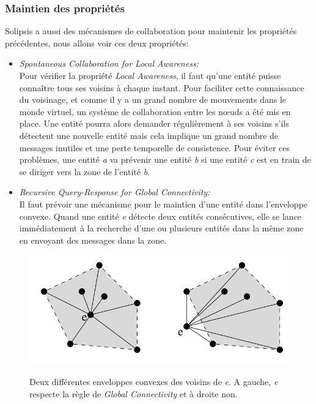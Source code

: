 		\subsubsection{Maintien des propriétés}
Solipsis a aussi des mécanismes de collaboration pour maintenir les propriétés précédentes, nous allons voir ces deux propriétés:
	\begin{itemize}
	\renewcommand{\labelitemi}{$\bullet$}
		\item \textit{Spontaneous Collaboration for Local Awareness:}\\
		 Pour vérifier la propriété \textit{Local Awareness}, il faut qu'une entité puisse connaître tous ses voisins à chaque instant. Pour faciliter cette connaissance du voisinage, et comme il y a un grand nombre de mouvements dans le monde virtuel, un système de collaboration entre les nœuds a été mis en place. Une entité pourra alors demander régulièrement à ses voisins s'ils détectent une nouvelle entité mais cela implique un grand nombre de messages inutiles et une perte temporelle de consistence. Pour éviter ces problèmes, une entité \textit{a} va prévenir une entité \textit{b} si une entité \textit{c} est en train de se diriger vers la zone de l'entité \textit{b}.
		\item \textit{Recursive Query-Response for Global Connectivity:}\\
		Il faut prévoir une mécanisme pour le maintien d'une entité dans l'enveloppe convexe. Quand une entité \textit{e} détecte deux entités consécutives, elle se lance immédiatement à la recherche d'une ou plusieurs entités dans la même zone en envoyant des messages dans la zone. \\ 
	\end{itemize}
        \vspace{1cm}
        \begin{figure}[!h]
	\centering
        \includegraphics[scale=0.9]{./Ressources/Images/envelop_convex1.png}\\
        \caption{Deux différentes enveloppes convexes des voisins de \textit{e}. A gauche, \textit{e} respecte la règle de \textit{Global Connectivity} et à droite non.}
        \label{Envelop_Convex}
        \end{figure}
